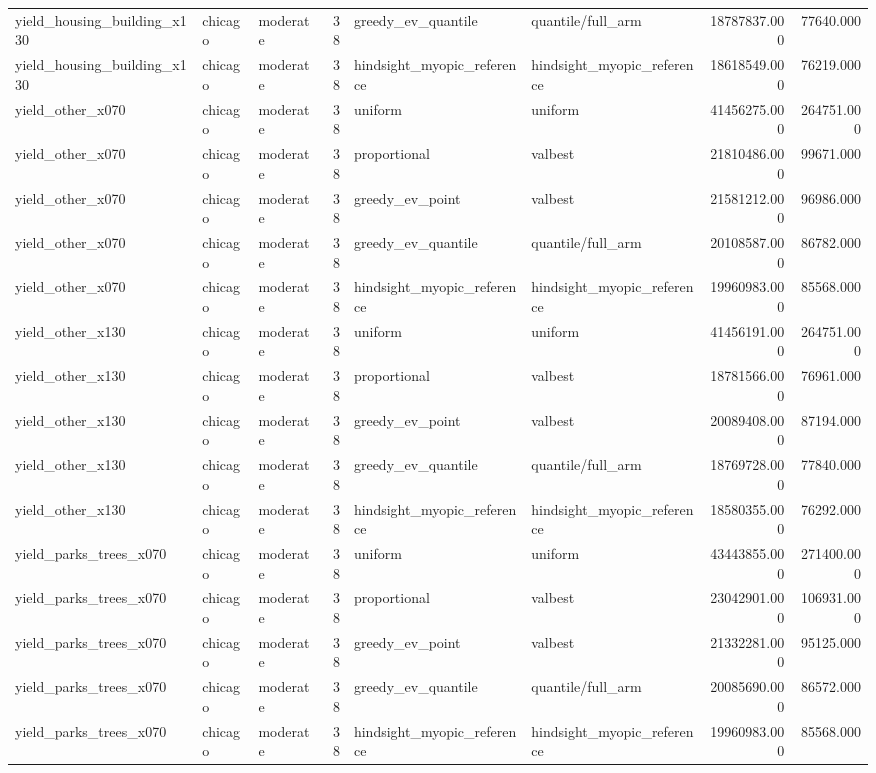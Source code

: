 \begin{tabular}{lllrllrr}
yield\_housing\_building\_x130 & chicago & moderate & 38 & greedy\_ev\_quantile & quantile/full\_arm & 18787837.000 & 77640.000 \\
yield\_housing\_building\_x130 & chicago & moderate & 38 & hindsight\_myopic\_reference & hindsight\_myopic\_reference & 18618549.000 & 76219.000 \\
yield\_other\_x070 & chicago & moderate & 38 & uniform & uniform & 41456275.000 & 264751.000 \\
yield\_other\_x070 & chicago & moderate & 38 & proportional & valbest & 21810486.000 & 99671.000 \\
yield\_other\_x070 & chicago & moderate & 38 & greedy\_ev\_point & valbest & 21581212.000 & 96986.000 \\
yield\_other\_x070 & chicago & moderate & 38 & greedy\_ev\_quantile & quantile/full\_arm & 20108587.000 & 86782.000 \\
yield\_other\_x070 & chicago & moderate & 38 & hindsight\_myopic\_reference & hindsight\_myopic\_reference & 19960983.000 & 85568.000 \\
yield\_other\_x130 & chicago & moderate & 38 & uniform & uniform & 41456191.000 & 264751.000 \\
yield\_other\_x130 & chicago & moderate & 38 & proportional & valbest & 18781566.000 & 76961.000 \\
yield\_other\_x130 & chicago & moderate & 38 & greedy\_ev\_point & valbest & 20089408.000 & 87194.000 \\
yield\_other\_x130 & chicago & moderate & 38 & greedy\_ev\_quantile & quantile/full\_arm & 18769728.000 & 77840.000 \\
yield\_other\_x130 & chicago & moderate & 38 & hindsight\_myopic\_reference & hindsight\_myopic\_reference & 18580355.000 & 76292.000 \\
yield\_parks\_trees\_x070 & chicago & moderate & 38 & uniform & uniform & 43443855.000 & 271400.000 \\
yield\_parks\_trees\_x070 & chicago & moderate & 38 & proportional & valbest & 23042901.000 & 106931.000 \\
yield\_parks\_trees\_x070 & chicago & moderate & 38 & greedy\_ev\_point & valbest & 21332281.000 & 95125.000 \\
yield\_parks\_trees\_x070 & chicago & moderate & 38 & greedy\_ev\_quantile & quantile/full\_arm & 20085690.000 & 86572.000 \\
yield\_parks\_trees\_x070 & chicago & moderate & 38 & hindsight\_myopic\_reference & hindsight\_myopic\_reference & 19960983.000 & 85568.000 \\

\end{tabular}
